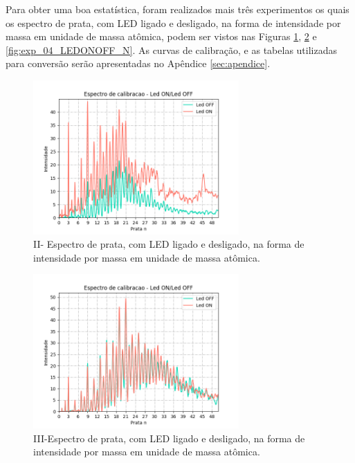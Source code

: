 Para obter uma boa estatística, foram realizados mais três experimentos os quais os espectro de prata, com LED ligado e desligado, na forma de intensidade por massa em unidade de massa atômica, podem ser vistos nas Figuras \ref{fig:exp_02_LEDONOFF_N}, \ref{fig:exp_03_LEDONOFF_N} e \ref{fig:exp_04_LEDONOFF_N}. As curvas de calibração, e as tabelas utilizadas para conversão serão apresentadas no Apêndice \ref{sec:apendice}.

\begin{figure}
  \centering  
  \includegraphics[width=0.7\textwidth]{exp_02/LED_ON_Led_OFF_espectro_calib_prata_N_.png}
  \caption{II- Espectro de prata, com LED ligado e desligado, na forma de intensidade por massa em unidade de massa atômica.}
  \label{fig:exp_02_LEDONOFF_N}
\end{figure}

\begin{figure}
  \centering  
  \includegraphics[width=0.7\textwidth]{exp_03/LED_ON_Led_OFF_espectro_calib_prata_N_.png}
  \caption{III-Espectro de prata, com LED ligado e desligado, na forma de intensidade por massa em unidade de massa atômica.}
  \label{fig:exp_03_LEDONOFF_N}
\end{figure}


